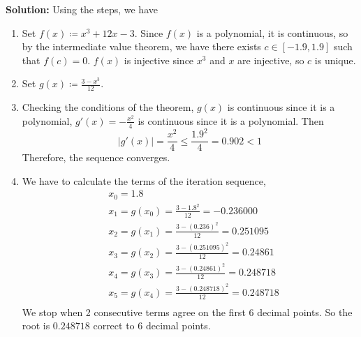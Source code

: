 \documentclass[openany]{report}
\begin{document}
\textbf{Solution:} Using the steps, we have 
\begin{enumerate}
    \item Set $f(x) \coloneqq x^3 + 12x - 3$. Since $f(x)$ is a polynomial, it is continuous, so by the intermediate value theorem, we have there exists $c \in [-1.9, 1.9]$ such that $f(c) = 0$. $f(x)$ is injective since $x^3$ and $x$ are injective, so $c$ is unique.
    \item Set $g(x) \coloneqq \frac{3-x^3}{12}$.
    \item Checking the conditions of the theorem, $g(x)$ is continuous since it is a polynomial, $g'(x) = -\frac{x^2}{4}$ is continuous since it is a polynomial. Then 
    \[|g'(x)| = \frac{x^2}{4} \leq \frac{1.9^2}{4} = 0.902 < 1\]
    Therefore, the sequence converges. 
    \item We have to calculate the terms of the iteration sequence, 
    \begin{align*}
        &x_0 = 1.8\\
        &x_1 = g(x_0) = \frac{3-1.8^2}{12} = -0.236000\\
        &x_2 = g(x_1) = \frac{3 - (0.236)^2}{12} = 0.251095\\
        &x_3 = g(x_2) = \frac{3 - (0.251095)^2}{12} = 0.24861\\
        &x_4 = g(x_3) = \frac{3 - (0.24861)^2}{12} = 0.248718\\
        &x_5 = g(x_4) = \frac{3 - (0.248718)^2}{12} = 0.248718\\
    \end{align*}
    We stop when 2 consecutive terms agree on the first 6 decimal points. So the root is $0.248718$ correct to 6 decimal points.
\end{enumerate}
\end{document}

